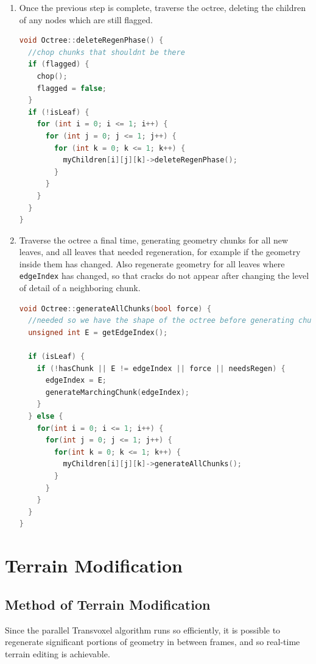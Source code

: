 \documentclass[11pt]{article}
\begin{document}
\begin{enumerate}
  \item Once the previous step is complete, traverse the octree, deleting the children of any nodes which are still flagged. 
  
  \begin{lstlisting}[language=C++,label={deleteregenphase},caption={The third stage in the octree refinement process, \texttt{deleteRegenPhase}}]
void Octree::deleteRegenPhase() {
  //chop chunks that shouldnt be there
  if (flagged) {
    chop();
    flagged = false;
  }
  if (!isLeaf) {
    for (int i = 0; i <= 1; i++) {
      for (int j = 0; j <= 1; j++) {
        for (int k = 0; k <= 1; k++) {
          myChildren[i][j][k]->deleteRegenPhase();
        }
      }
    }
  }  
}
  \end{lstlisting}
  \item Traverse the octree a final time, generating geometry chunks for all new leaves, and all leaves that needed regeneration, for example if the geometry inside them has changed.  Also regenerate geometry for all leaves where \texttt{edgeIndex} has changed, so that cracks do not appear after changing the level of detail of a neighboring chunk.
  \begin{lstlisting}[language=C++,label={generateallchunks},caption={The fourth stage in the octree refinement process, \texttt{generateAllChunks}}]
void Octree::generateAllChunks(bool force) {
  //needed so we have the shape of the octree before generating chunks that rely on it
  unsigned int E = getEdgeIndex();

  if (isLeaf) {
    if (!hasChunk || E != edgeIndex || force || needsRegen) {
      edgeIndex = E;
      generateMarchingChunk(edgeIndex);
    }
  } else {
    for(int i = 0; i <= 1; i++) {
      for(int j = 0; j <= 1; j++) {
        for(int k = 0; k <= 1; k++) {
          myChildren[i][j][k]->generateAllChunks();
        }
      }
    }
  }
}
  \end{lstlisting}
\end{enumerate}

\section{Terrain Modification}
\subsection{Method of Terrain Modification}
Since the parallel Transvoxel algorithm runs so efficiently, it is possible to regenerate significant portions of geometry in between frames, and so real-time terrain editing is achievable.\\
\end{document}

